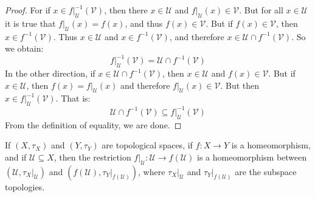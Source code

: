 \documentclass[oneside]{book}                                                  %
\begin{document}
            \begin{proof}
                For if $x\in{f}|_{\mathcal{U}}^{\minus{1}}(\mathcal{V})$, then
                there $x\in\mathcal{U}$ and $f|_{\mathcal{U}}(x)\in\mathcal{V}$.
                But for all $x\in\mathcal{U}$ it is true that
                $f|_{\mathcal{U}}(x)=f(x)$, and thus $f(x)\in\mathcal{V}$. But
                if $f(x)\in\mathcal{V}$, then
                $x\in{f}^{\minus{1}}(\mathcal{V})$. Thus $x\in\mathcal{U}$ and
                $x\in{f}^{\minus{1}}(\mathcal{V})$, and therefore
                $x\in\mathcal{U}\cap{f}^{\minus{1}}(\mathcal{V})$. So we obtain:
                \begin{equation}
                    f|_{\mathcal{U}}^{\minus{1}}(\mathcal{V})
                    =\mathcal{U}\cap{f}^{\minus{1}}(\mathcal{V})
                \end{equation}
                In the other direction, if
                $x\in\mathcal{U}\cap{f}^{\minus{1}}(\mathcal{V})$, then
                $x\in\mathcal{U}$ and $f(x)\in\mathcal{V}$. But if
                $x\in\mathcal{U}$, then $f(x)=f|_{\mathcal{U}}(x)$ and therefore
                $f|_{\mathcal{U}}(x)\in\mathcal{V}$. But then
                $x\in{f}|_{\mathcal{U}}^{\minus{1}}(\mathcal{V})$. That is:
                \begin{equation}
                    \mathcal{U}\cap{f}^{\minus{1}}(\mathcal{V})
                    \subseteq{f}|_{\mathcal{U}}^{\minus{1}}(\mathcal{V})
                \end{equation}
                From the definition of equality, we are done.
            \end{proof}
            \begin{theorem}
                If $(X,\tau_{X})$ and $(Y,\tau_{Y})$ are topological spaces,
                if $f:X\rightarrow{Y}$ is a homeomorphism, and if
                $\mathcal{U}\subseteq{X}$, then the restriction
                $f|_{\mathcal{U}}:\mathcal{U}\rightarrow{f}(\mathcal{U})$ is
                a homeomorphism between $(\mathcal{U},\tau_{X}|_{\mathcal{U}})$
                and $(f(\mathcal{U}),\tau_{Y}|_{f(\mathcal{U})})$, where
                $\tau_{X}|_{\mathcal{U}}$ and $\tau_{Y}|_{f(\mathcal{U})}$ are
                the subspace topologies.
            \end{theorem}
\end{document}
